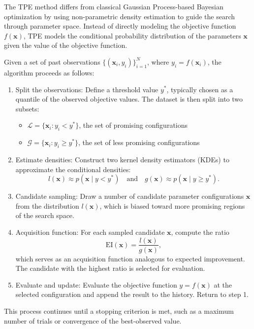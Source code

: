 The TPE method differs from classical Gaussian Process-based Bayesian optimization by using non-parametric density estimation to guide the search through parameter space. 
Instead of directly modeling the objective function $f(\mathbf{x})$, TPE models the conditional probability distribution of the parameters $\mathbf{x}$ given the value of the objective function.

Given a set of past observations $\{ (\mathbf{x}_i, y_i) \}_{i=1}^N$, where $ y_i = f(\mathbf{x}_i) $, the algorithm proceeds as follows:

\begin{enumerate}
    \item Split the observations: Define a threshold value $ y^* $, typically chosen as a quantile of the observed objective values. 
        The dataset is then split into two subsets:
        \begin{itemize}
            \item $\mathcal{L} = \{ \mathbf{x}_i : y_i < y^* \}$, the set of promising configurations
            \item $\mathcal{G} = \{ \mathbf{x}_i : y_i \geq y^* \}$, the set of less promising configurations
        \end{itemize}
    \item Estimate densities: Construct two kernel density estimators (KDEs) to approximate the conditional densities:
    \[
    l(\mathbf{x}) \approx p(\mathbf{x} \mid y < y^*) \quad \text{and} \quad g(\mathbf{x}) \approx p(\mathbf{x} \mid y \geq y^*).
    \]
    \item Candidate sampling: Draw a number of candidate parameter configurations $\mathbf{x}$ from the distribution $l(\mathbf{x})$, which is biased toward more promising regions of the search space.
    \item Acquisition function: For each sampled candidate $\mathbf{x}$, compute the ratio
    \[
    \text{EI}(\mathbf{x}) = \frac{l(\mathbf{x})}{g(\mathbf{x})},
    \]
    which serves as an acquisition function analogous to expected improvement. The candidate with the highest ratio is selected for evaluation.
    \item Evaluate and update: Evaluate the objective function $ y = f(\mathbf{x}) $ at the selected configuration and append the result to the history. Return to step 1.
\end{enumerate}
This process continues until a stopping criterion is met, such as a maximum number of trials or convergence of the best-observed value.

